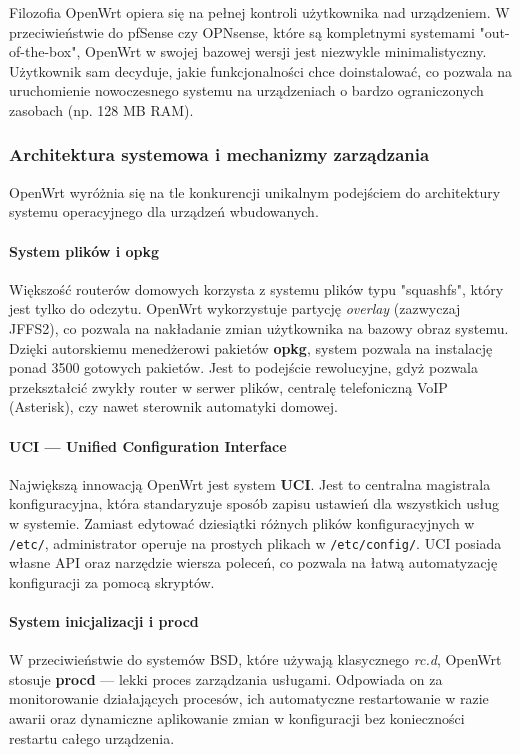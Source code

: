 \documentclass[12pt,a4paper]{article}
\begin{document}
Filozofia OpenWrt opiera się na pełnej kontroli użytkownika nad urządzeniem. W przeciwieństwie do pfSense czy OPNsense, które są kompletnymi systemami "out-of-the-box", OpenWrt w swojej bazowej wersji jest niezwykle minimalistyczny. Użytkownik sam decyduje, jakie funkcjonalności chce doinstalować, co pozwala na uruchomienie nowoczesnego systemu na urządzeniach o bardzo ograniczonych zasobach (np. 128 MB RAM).

\subsubsection{Architektura systemowa i mechanizmy zarządzania}
OpenWrt wyróżnia się na tle konkurencji unikalnym podejściem do architektury systemu operacyjnego dla urządzeń wbudowanych.

\paragraph{System plików i opkg}
Większość routerów domowych korzysta z systemu plików typu "squashfs", który jest tylko do odczytu. OpenWrt wykorzystuje partycję \textit{overlay} (zazwyczaj JFFS2), co pozwala na nakładanie zmian użytkownika na bazowy obraz systemu. Dzięki autorskiemu menedżerowi pakietów \textbf{opkg}, system pozwala na instalację ponad 3500 gotowych pakietów. Jest to podejście rewolucyjne, gdyż pozwala przekształcić zwykły router w serwer plików, centralę telefoniczną VoIP (Asterisk), czy nawet sterownik automatyki domowej.

\paragraph{UCI --- Unified Configuration Interface}
Największą innowacją OpenWrt jest system \textbf{UCI}. Jest to centralna magistrala konfiguracyjna, która standaryzuje sposób zapisu ustawień dla wszystkich usług w systemie. Zamiast edytować dziesiątki różnych plików konfiguracyjnych w \texttt{/etc/}, administrator operuje na prostych plikach w \texttt{/etc/config/}. UCI posiada własne API oraz narzędzie wiersza poleceń, co pozwala na łatwą automatyzację konfiguracji za pomocą skryptów.

\paragraph{System inicjalizacji i procd}
W przeciwieństwie do systemów BSD, które używają klasycznego \textit{rc.d}, OpenWrt stosuje \textbf{procd} --- lekki proces zarządzania usługami. Odpowiada on za monitorowanie działających procesów, ich automatyczne restartowanie w razie awarii oraz dynamiczne aplikowanie zmian w konfiguracji bez konieczności restartu całego urządzenia.
\end{document}
